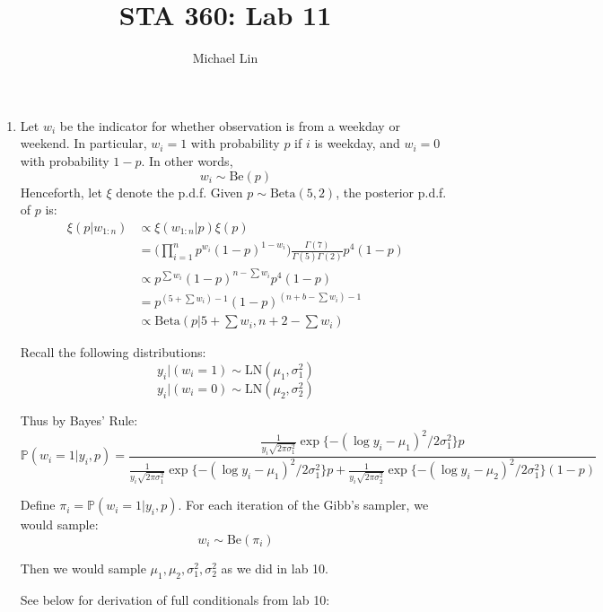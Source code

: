 \documentclass{article}
\title{STA 360: Lab 11}
\author{Michael Lin}
\begin{document}
\maketitle

\begin{enumerate}
\item Let $w_i$ be the indicator for whether observation is from a weekday or weekend. In particular, $w_i=1$ with probability $p$ if $i$ is weekday, and $w_i=0$ with probability $1-p$. In other words,
$$w_i\sim \text{Be}(p)$$
Henceforth, let $\xi$ denote the p.d.f. Given $p \sim \text{Beta}(5,2)$, the posterior p.d.f. of $p$ is:
\begin{align*}
\xi(p|w_{1:n}) &\propto \xi(w_{1:n}|p)\xi(p) \\
&=\Big(\prod_{i=1}^{n} p^{w_i}(1-p)^{1-w_i} \Big)\frac{\Gamma(7)}{\Gamma(5)\Gamma(2)}p^4(1-p) \\
&\propto p^{\sum w_i}(1-p)^{n-\sum w_i}p^4(1-p) \\
&=p^{(5+\sum w_i)-1}(1-p)^{(n+b-\sum w_i)-1} \\
&\propto \text{Beta}(p | 5+\sum w_i, n+2-\sum w_i)
\end{align*}

Recall the following distributions:
$$y_i | (w_i=1) \sim \text{LN}(\mu_1, \sigma_1^2)$$
$$y_i | (w_i=0) \sim \text{LN}(\mu_2, \sigma_2^2)$$

Thus by Bayes' Rule:
$$\mathds{P}(w_i=1|y_i, p) = \frac{\frac{1}{y_i \sqrt{2\pi\sigma_1^2}}\exp\{-(\log y_i-\mu_1)^2/2\sigma_1^2\}p}{\frac{1}{y_i \sqrt{2\pi\sigma_1^2}}\exp\{-(\log y_i-\mu_1)^2/2\sigma_1^2\}p + \frac{1}{y_i \sqrt{2\pi\sigma_2^2}}\exp\{-(\log y_i-\mu_2)^2/2\sigma_1^2\}(1-p)}$$

Define $\pi_i = \mathds{P}(w_i=1|y_i, p)$. For each iteration of the Gibb's sampler, we would sample:
$$w_i\sim \text{Be}(\pi_i)$$

Then we would sample $\mu_1, \mu_2, \sigma_1^2, \sigma_2^2$ as we did in lab 10.

See below for derivation of full conditionals from lab 10:


\end{enumerate}
\end{document}
